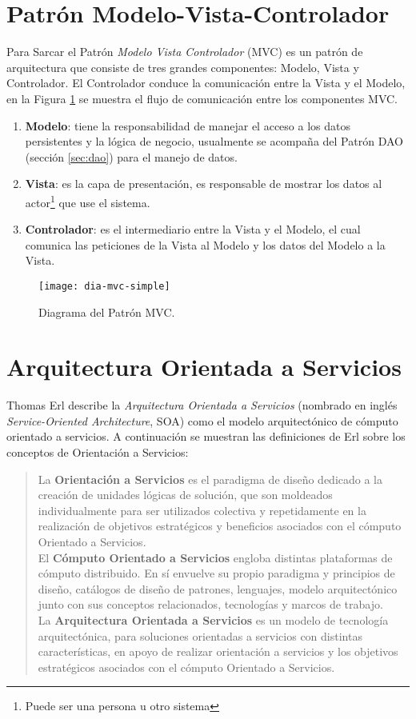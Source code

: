 \section{Patrón Modelo-Vista-Controlador}\label{sec:mvc}
Para Sarcar\cite{JavaDesignPatternsExamples} el Patrón \textit{Modelo Vista Controlador} (MVC) es un patrón de arquitectura que consiste de tres grandes componentes: Modelo, Vista y Controlador. El Controlador conduce la comunicación entre la Vista y el Modelo, en la Figura \ref{fig:dia-mvc-simple} se muestra el flujo de comunicación entre los componentes MVC.
\begin{enumerate}
	\item \textbf{Modelo}: tiene la responsabilidad de manejar el acceso a los datos persistentes y la lógica de negocio, usualmente se acompaña del Patrón DAO (sección \ref{sec:dao}) para el manejo de datos.
	\item \textbf{Vista}: es la capa de presentación, es responsable de mostrar los datos al actor\footnote{Puede ser una persona u otro sistema} que use el sistema.
	\item \textbf{Controlador}: es el intermediario entre la Vista y el Modelo, el cual comunica las peticiones de la Vista al Modelo y los datos del Modelo a la Vista.
\end{enumerate}
\begin{figure}[h]
  \centering
  \texttt{[image: dia-mvc-simple]}
  \caption{Diagrama del Patrón MVC\cite{JavaDesignPatternsExamples}.}
  \label{fig:dia-mvc-simple}
\end{figure}

\section{Arquitectura Orientada a Servicios}\label{sec:soa}
Thomas Erl describe la \textit{Arquitectura Orientada a Servicios} (nombrado en inglés \textit{Service-Oriented Architecture}, SOA) como el modelo arquitectónico de cómputo orientado a servicios\cite{SOAWithRest}. A continuación se muestran las definiciones de Erl\cite{SOAWithRest} sobre los conceptos de Orientación a Servicios:
\begin{quote}
La \textbf{Orientación a Servicios} es el paradigma de diseño dedicado a la creación de unidades lógicas de solución, que son moldeados individualmente para ser utilizados colectiva y repetidamente en la realización de objetivos estratégicos y beneficios asociados con el cómputo Orientado a Servicios.\\
El \textbf{Cómputo Orientado a Servicios} engloba distintas plataformas de cómputo distribuido. En sí envuelve su propio paradigma y principios de diseño, catálogos de diseño de patrones, lenguajes, modelo arquitectónico junto con sus conceptos relacionados, tecnologías y marcos de trabajo.\\
La \textbf{Arquitectura Orientada a Servicios} es un modelo de tecnología arquitectónica, para soluciones orientadas a servicios con distintas características, en apoyo de realizar orientación a servicios y los objetivos estratégicos asociados con el cómputo Orientado a Servicios.
\end{quote}
